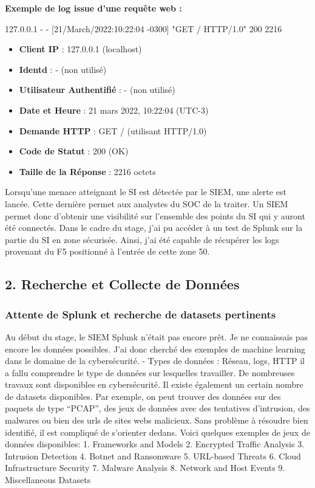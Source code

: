\documentclass[
  letterpaper,
  DIV=11,
  numbers=noendperiod]{scrartcl}
\newenvironment{Shaded}{\begin{snugshade}}{\end{snugshade}}
\newcommand{\NormalTok}[1]{\textcolor[rgb]{0.00,0.23,0.31}{#1}}
\providecommand{\tightlist}{%
  \setlength{\itemsep}{0pt}\setlength{\parskip}{0pt}}\usepackage{longtable,booktabs,array}
\begin{document}
\textbf{Exemple de log issue d'une requête web :}

\begin{Shaded}
\begin{Highlighting}[]
\NormalTok{127.0.0.1 {-} {-} [21/March/2022:10:22:04 {-}0300] "GET / HTTP/1.0" 200 2216}
\end{Highlighting}
\end{Shaded}

\begin{itemize}
\tightlist
\item
  \textbf{Client IP} : 127.0.0.1 (localhost)
\item
  \textbf{Identd} : - (non utilisé)
\item
  \textbf{Utilisateur Authentifié} : - (non utilisé)
\item
  \textbf{Date et Heure} : 21 mars 2022, 10:22:04 (UTC-3)
\item
  \textbf{Demande HTTP} : GET / (utilisant HTTP/1.0)
\item
  \textbf{Code de Statut} : 200 (OK)
\item
  \textbf{Taille de la Réponse} : 2216 octets
\end{itemize}

Lorsqu'une menace atteignant le SI est détectée par le SIEM, une alerte
est lancée. Cette dernière permet aux analystes du SOC de la traiter. Un
SIEM permet donc d'obtenir une visibilité sur l'ensemble des points du
SI qui y auront été connectés. Dans le cadre du stage, j'ai pu accéder à
un test de Splunk sur la partie du SI en zone sécurisée. Ainsi, j'ai été
capable de récupérer les logs provenant du F5 positionné à l'entrée de
cette zone 50.

\subsection{2. Recherche et Collecte de
Données}\label{recherche-et-collecte-de-donnuxe9es}

\subsubsection{Attente de Splunk et recherche de datasets
pertinents}\label{attente-de-splunk-et-recherche-de-datasets-pertinents}

Au début du stage, le SIEM Splunk n'était pas encore prêt. Je ne
connaissais pas encore les données possibles. J'ai donc cherché des
exemples de machine learning dans le domaine de la cybersécurité. -
Types de données : Réseau, logs, HTTP il a fallu comprendre le type de
données sur lesquelles travailler. De nombreuses travaux sont
disponibles en cybersécurité. Il existe également un certain nombre de
datasets disponibles. Par exemple, on peut trouver des données sur des
paquets de type ``PCAP'', des jeux de données avec des tentatives
d'intrusion, des malwares ou bien des urls de sites webs malicieux. Sans
problème à résoudre bien identifié, il est compliqué de s'orienter
dedans. Voici quelques exemples de jeux de données disponibles: 1.
Frameworks and Models 2. Encrypted Traffic Analysis 3. Intrusion
Detection 4. Botnet and Ransomware 5. URL-based Threats 6. Cloud
Infrastructure Security 7. Malware Analysis 8. Network and Host Events
9. Miscellaneous Datasets
\end{document}
